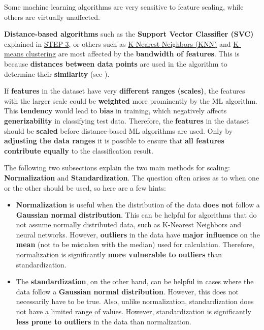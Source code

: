\documentclass [oneside,10pt,a4paper,ngerman,BCOR10mm,headsepline,parindent,final]{scrartcl}
\providecommand{\tightlist}{%
      \setlength{\itemsep}{0pt}\setlength{\parskip}{0pt}}
\begin{document}
Some machine learning algorithms are very sensitive to feature scaling,
while others are virtually unaffected.

\textbf{Distance-based algorithms} such as the \textbf{Support Vector
Classifier (SVC)} explained in
\hyperref[step-3-choose-and-create-the-ml-model]{STEP 3}, or others such
as
\href{https://en.wikipedia.org/wiki/K-nearest_neighbors_algorithm}{K-Nearest
Neighbors (KNN)} and
\href{https://en.wikipedia.org/wiki/K-means_clustering}{K-means
clustering} are most affected by the \textbf{bandwidth of features}.
This is because \textbf{distances between data points} are used in the
algorithm to determine their \textbf{similarity} (see
\cite{feature_scaling_2020}).

If \textbf{features} in the dataset have very \textbf{different ranges
(scales)}, the features with the larger scale could be \textbf{weighted}
more prominently by the ML algorithm. This \textbf{tendency} would lead
to \textbf{bias} in training, which negatively affects
\textbf{generizability} in classifying test data. Therefore, the
\textbf{features} in the dataset should be \textbf{scaled} before
distance-based ML algorithms are used. Only by \textbf{adjusting the
data ranges} it is possible to ensure that \textbf{all features
contribute equally} to the classification result.

The following two subsections explain the two main methods for scaling:
\textbf{Normalization} and \textbf{Standardization}. The question often
arises as to when one or the other should be used, so here are a few
hints:

\begin{itemize}
\tightlist
\item
  \textbf{Normalization} is useful when the distribution of the data
  \textbf{does not} follow a \textbf{Gaussian normal distribution}. This
  can be helpful for algorithms that do not assume normally distributed
  data, such as K-Nearest Neighbors and neural networks. However,
  \textbf{outliers} in the data have \textbf{major influence} on the
  \textbf{mean} (not to be mistaken with the median) used for
  calculation. Therefore, normalization is significantly \textbf{more
  vulnerable to outliers} than standardization.
\item
  The \textbf{standardization}, on the other hand, can be helpful in
  cases where the data follow a \textbf{Gaussian normal distribution}.
  However, this does not necessarily have to be true. Also, unlike
  normalization, standardization does not have a limited range of
  values. However, standardization is significantly \textbf{less prone
  to outliers} in the data than normalization.
\end{itemize}
\end{document}
